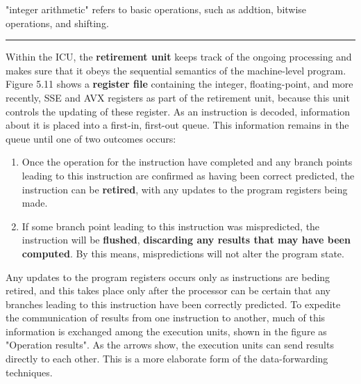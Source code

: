 \documentclass[11pt]{article}
\begin{document}
"integer arithmetic" refers to basic operations, such as addtion, bitwise operations, and shifting.\\

\noindent\rule{\textwidth}{0.5pt}

Within the ICU, the \textbf{retirement unit} keeps track of the ongoing processing and makes sure that it obeys the sequential semantics of the machine-level program. Figure 5.11 shows a \textbf{register file} containing the integer, floating-point, and more recently, SSE and AVX registers as part of the retirement unit, because this unit controls the updating of these register. As an instruction is decoded, information about it is placed into a first-in, first-out queue. This information remains in the queue until one of two outcomes occurs:\\
\begin{enumerate}
\item Once the operation for the instruction have completed and any branch points leading to this instruction are confirmed as having been correct predicted, the instruction can be \textbf{retired}, with any updates to the program registers being made.\\
\item If some branch point leading to this instruction was mispredicted, the instruction will be \textbf{flushed}, \textbf{discarding any results that may have been computed}. By this means, mispredictions will not alter the program state.\\
\end{enumerate}


Any updates to the program registers occurs only as instructions are beding retired, and this takes place only after the processor can be certain that any branches leading to this instruction have been correctly predicted. To expedite the communication of results from one instruction to another, much of this information is exchanged among the execution units, shown in the figure as "Operation results". As the arrows show, the execution units can send results directly to each other. This is a more elaborate form of the data-forwarding techniques.\\
\end{document}
